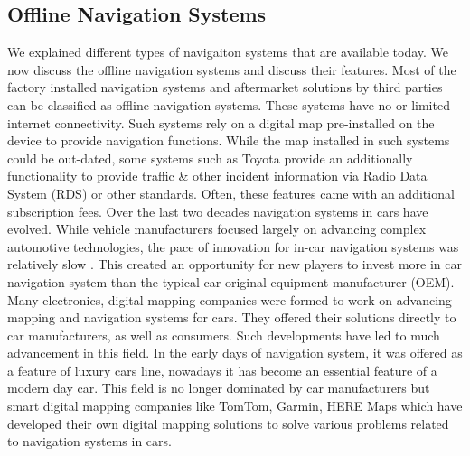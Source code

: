 \subsection{Offline Navigation Systems} \label{offlinenav}
We explained different types of navigaiton systems that are available today. We now discuss the offline navigation systems and discuss their features. Most of the factory installed navigation systems and aftermarket solutions by third parties can be classified as offline navigation systems. These systems have no or limited internet connectivity. Such systems rely on a digital map pre-installed on the device to provide navigation functions. While the map installed in such systems could be out-dated, some systems such as Toyota \citep{ishikawa1991map} provide an additionally functionality to provide traffic \& other incident information via Radio Data System (RDS) or other standards. Often, these features came with an additional subscription fees. Over the last two decades navigation systems in cars have evolved. While vehicle manufacturers focused largely on advancing complex automotive technologies, the pace of innovation for in-car navigation systems was relatively slow \cite{schaminee2011short}. This created an opportunity for new players to invest more in car navigation system than the typical car original equipment manufacturer (OEM). Many electronics, digital mapping companies were formed to work on advancing mapping and navigation systems for cars. They offered their solutions directly to car manufacturers, as well as consumers. Such developments have led to much advancement in this field. In the early days of navigation system, it was offered as a feature of luxury cars line, nowadays it has become an essential feature of a modern day car. This field is no longer dominated by car manufacturers but smart digital mapping companies like TomTom, Garmin, HERE Maps which have developed their own digital mapping solutions to solve various problems related to navigation systems in cars.\\

